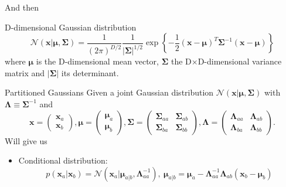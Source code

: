 \begin{frame}{\insertsubsection}
And then
\begin{block}{D-dimensional Gaussian distribution}
\begin{equation*}
	\mathcal{N}(\mathbf{x} | \boldsymbol{\mu}, \boldsymbol{\Sigma}) = \frac{1}{(2 \pi )^{D/2}} \frac{1}{|\boldsymbol{\Sigma}|^{1/2}} \exp \left\{ -\frac{1}{2} (\mathbf{x} - \boldsymbol{\mu})^T \boldsymbol{\Sigma} ^{-1} (\mathbf{x} - \boldsymbol{\mu})  \right\} 
\end{equation*}
where $\boldsymbol{\mu}$ is the D-dimensional mean vector, $\boldsymbol{\Sigma}$ the D$\times$D-dimensional variance matrix and $|\boldsymbol{\Sigma}|$ its determinant.
\end{block}
\end{frame}

 \begin{frame}{\insertsubsection}
 
 \begin{block}{Partitioned Gaussians}
 Given a joint Gaussian distribution $\mathcal{N}(\mathbf{x} | \boldsymbol{\mu}, \boldsymbol{\Sigma})$ with $\boldsymbol{\Lambda} \equiv \boldsymbol{\Sigma}^{-1}$ and
 \begin{equation*}
 	\mathbf{x} = 
 	 \begin{pmatrix}
 		\mathbf{x} _{a} \\
 		\mathbf{x} _{b}
 	\end{pmatrix} , 
 	\boldsymbol{\mu} = 
 	 \begin{pmatrix}
 		\boldsymbol{\mu}_{a} \\
 		\boldsymbol{\mu}_{b}
 	\end{pmatrix} , 
 	 \boldsymbol{\Sigma} = 
 	 \begin{pmatrix}
 		\boldsymbol{\Sigma}_{aa} & \boldsymbol{\Sigma}_{ab} \\
 		\boldsymbol{\Sigma}_{ba} & \boldsymbol{\Sigma}_{bb} 
 	\end{pmatrix} ,  \boldsymbol{\Lambda} = 
 	 \begin{pmatrix}
 		\boldsymbol{\Lambda}_{aa} & \boldsymbol{\Lambda}_{ab} \\
 		\boldsymbol{\Lambda}_{ba} & \boldsymbol{\Lambda}_{bb} 
 	\end{pmatrix}.
 \end{equation*}
 Will give us \\
 \begin{itemize}
 \item \textcolor{UniGold}{Conditional distribution:}
 \begin{equation*}
 p\left( \mathbf{x}_a | \mathbf{x}_b \right) = \mathcal{N}\left( \mathbf{x}_a| \boldsymbol{\mu}_{a|b}, \boldsymbol{\Lambda}^{-1}_{aa} \right), \  \boldsymbol{\mu}_{a|b} =  \boldsymbol{\mu}_a - \boldsymbol{\Lambda}^{-1}_{aa}\boldsymbol{\Lambda}_{ab} \left( \mathbf{x}_b - \boldsymbol{\mu}_b \right)
 \end{equation*}


\end{itemize}
\end{block}
\end{frame}
